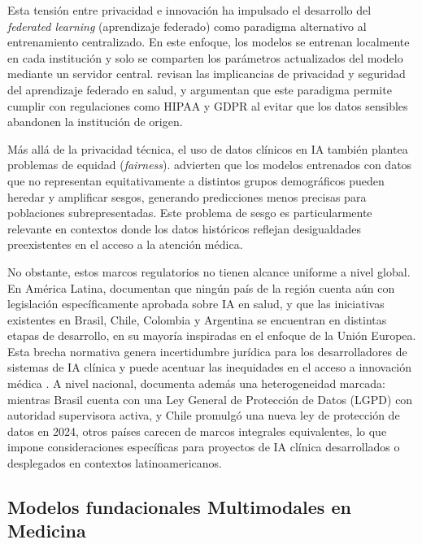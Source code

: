 Esta tensión entre privacidad e innovación ha impulsado el desarrollo del \textit{federated 
learning} (aprendizaje federado) como paradigma alternativo al entrenamiento centralizado. 
En este enfoque, los modelos se entrenan localmente en cada institución y solo se comparten 
los parámetros actualizados del modelo mediante un servidor central. 
\textcite{Pati2024} revisan las implicancias de privacidad y seguridad del aprendizaje 
federado en salud, y argumentan que este paradigma permite cumplir con regulaciones como 
HIPAA y GDPR al evitar que los datos sensibles abandonen la institución de origen.

Más allá de la privacidad técnica, el uso de datos clínicos en IA también plantea problemas 
de equidad (\textit{fairness}). \textcite{Alhumaidi2025} advierten que los modelos entrenados 
con datos que no representan equitativamente a distintos grupos demográficos pueden heredar 
y amplificar sesgos, generando predicciones menos precisas para poblaciones subrepresentadas.
Este problema de sesgo es particularmente relevante en contextos donde los datos históricos reflejan desigualdades 
preexistentes en el acceso a la atención médica.

No obstante, estos marcos regulatorios no tienen alcance uniforme a nivel global. En América 
Latina, \textcite{Kohan2024} documentan que ningún país de la región cuenta aún con legislación 
específicamente aprobada sobre IA en salud, y que las iniciativas existentes en Brasil, Chile, 
Colombia y Argentina se encuentran en distintas etapas de desarrollo, en su mayoría inspiradas 
en el enfoque de la Unión Europea. Esta brecha normativa genera incertidumbre jurídica para 
los desarrolladores de sistemas de IA clínica y puede acentuar las inequidades en el acceso a 
innovación médica \parencite{Lazarotto2025}. A nivel nacional, \textcite{Lazarotto2025} documenta
además una heterogeneidad marcada: mientras Brasil cuenta con una Ley General de Protección 
de Datos (LGPD) con autoridad supervisora activa, y Chile promulgó una nueva ley de protección 
de datos en 2024, otros países carecen de marcos integrales equivalentes, lo que impone 
consideraciones específicas para proyectos de IA clínica desarrollados o desplegados en 
contextos latinoamericanos.


\subsection{Modelos fundacionales Multimodales en Medicina}

